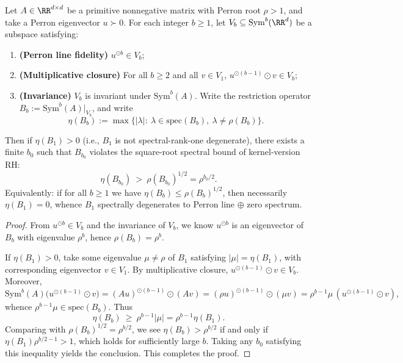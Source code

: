 \begin{theorem}\label{thm:pom-functorial-kernel-rh-impossibility}
Let \(A\in\RR^{d\times d}\) be a primitive nonnegative matrix with Perron root \(\rho>1\), and take a Perron eigenvector \(u\succ0\).
For each integer \(b\ge 1\), let \(V_b\subseteq \mathrm{Sym}^b(\RR^d)\) be a subspace satisfying:
\begin{enumerate}
  \item \textbf{(Perron line fidelity)} \(u^{\odot b}\in V_b\);
  \item \textbf{(Multiplicative closure)} For all \(b\ge 2\) and all \(v\in V_1\), \(u^{\odot(b-1)}\odot v\in V_b\);
  \item \textbf{(Invariance)} \(V_b\) is invariant under \(\mathrm{Sym}^b(A)\). Write the restriction operator \(B_b:=\mathrm{Sym}^b(A)|_{V_b}\), and write
  \[
  \eta(B_b):=\max\bigl\{|\lambda|:\ \lambda\in\mathrm{spec}(B_b),\ \lambda\ne \rho(B_b)\bigr\}.
  \]
\end{enumerate}
Then if \(\eta(B_1)>0\) (i.e., \(B_1\) is not spectral-rank-one degenerate), there exists a finite \(b_0\) such that \(B_{b_0}\) violates the square-root spectral bound of kernel-version RH:
\[
\eta(B_{b_0})\ >\ \rho(B_{b_0})^{1/2}=\rho^{b_0/2}.
\]
Equivalently: if for all \(b\ge 1\) we have \(\eta(B_b)\le \rho(B_b)^{1/2}\), then necessarily \(\eta(B_1)=0\), whence \(B_1\) spectrally degenerates to Perron line \(\oplus\) zero spectrum.
\end{theorem}
\begin{proof}
From \(u^{\odot b}\in V_b\) and the invariance of \(V_b\), we know \(u^{\odot b}\) is an eigenvector of \(B_b\) with eigenvalue \(\rho^b\), hence \(\rho(B_b)=\rho^b\).
\par
If \(\eta(B_1)>0\), take some eigenvalue \(\mu\ne\rho\) of \(B_1\) satisfying \(|\mu|=\eta(B_1)\), with corresponding eigenvector \(v\in V_1\).
By multiplicative closure, \(u^{\odot(b-1)}\odot v\in V_b\).
Moreover,
\[
\mathrm{Sym}^b(A)\bigl(u^{\odot(b-1)}\odot v\bigr)
=(Au)^{\odot(b-1)}\odot(Av)
=(\rho u)^{\odot(b-1)}\odot(\mu v)
=\rho^{b-1}\mu\,(u^{\odot(b-1)}\odot v),
\]
whence \(\rho^{b-1}\mu\in\mathrm{spec}(B_b)\).
Thus
\[
\eta(B_b)\ \ge\ \rho^{b-1}|\mu|=\rho^{b-1}\eta(B_1).
\]
Comparing with \(\rho(B_b)^{1/2}=\rho^{b/2}\), we see
\(
\eta(B_b)>\rho^{b/2}
\)
if and only if \(\eta(B_1)\rho^{b/2-1}>1\), which holds for sufficiently large \(b\).
Taking any \(b_0\) satisfying this inequality yields the conclusion. This completes the proof.
\end{proof}

